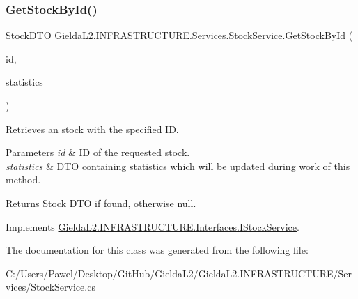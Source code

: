\subsubsection{\texorpdfstring{GetStockById()}{GetStockById()}}
{\footnotesize\ttfamily \mbox{\hyperlink{class_gielda_l2_1_1_i_n_f_r_a_s_t_r_u_c_t_u_r_e_1_1_d_t_o_1_1_stock_d_t_o}{Stock\+D\+TO}} Gielda\+L2.\+I\+N\+F\+R\+A\+S\+T\+R\+U\+C\+T\+U\+R\+E.\+Services.\+Stock\+Service.\+Get\+Stock\+By\+Id (\begin{DoxyParamCaption}\item[{int}]{id,  }\item[{\mbox{\hyperlink{class_gielda_l2_1_1_i_n_f_r_a_s_t_r_u_c_t_u_r_e_1_1_d_t_o_1_1_statistics_d_t_o}{Statistics\+D\+TO}}}]{statistics }\end{DoxyParamCaption})}



Retrieves an stock with the specified ID. 


\begin{DoxyParams}{Parameters}
{\em id} & ID of the requested stock.\\
\hline
{\em statistics} & \mbox{\hyperlink{namespace_gielda_l2_1_1_i_n_f_r_a_s_t_r_u_c_t_u_r_e_1_1_d_t_o}{D\+TO}} containing statistics which will be updated during work of this method.\\
\hline
\end{DoxyParams}
\begin{DoxyReturn}{Returns}
Stock \mbox{\hyperlink{namespace_gielda_l2_1_1_i_n_f_r_a_s_t_r_u_c_t_u_r_e_1_1_d_t_o}{D\+TO}} if found, otherwise null.
\end{DoxyReturn}


Implements \mbox{\hyperlink{interface_gielda_l2_1_1_i_n_f_r_a_s_t_r_u_c_t_u_r_e_1_1_interfaces_1_1_i_stock_service_ae04641f95a30ef6f62d499ef921646f7}{Gielda\+L2.\+I\+N\+F\+R\+A\+S\+T\+R\+U\+C\+T\+U\+R\+E.\+Interfaces.\+I\+Stock\+Service}}.



The documentation for this class was generated from the following file\+:\begin{DoxyCompactItemize}
\item 
C\+:/\+Users/\+Pawel/\+Desktop/\+Git\+Hub/\+Gielda\+L2/\+Gielda\+L2.\+I\+N\+F\+R\+A\+S\+T\+R\+U\+C\+T\+U\+R\+E/\+Services/Stock\+Service.\+cs\end{DoxyCompactItemize}
